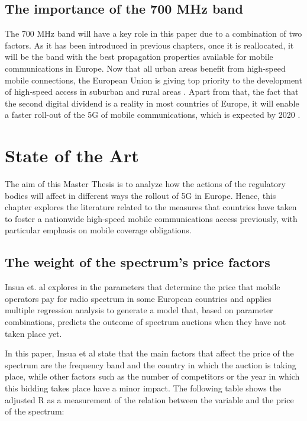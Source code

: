 \subsection*{The importance of the 700 MHz band}
The 700 MHz band will have a key role in this paper due to a combination of two factors. As it has been introduced in previous chapters, once it is reallocated, it will be the band with the best propagation properties available for mobile communications in Europe. Now that all urban areas benefit from high-speed mobile connections, the European Union is giving top priority to the development of high-speed access in suburban and rural areas \cite{1-28}. Apart from that, the fact that the second digital dividend is a reality in most countries of Europe, it will enable a faster roll-out of the 5G of mobile communications, which is expected by 2020 \cite{1-29}. \par

\section{State of the Art}
The aim of this Master Thesis is to analyze how the actions of the regulatory bodies will affect in different ways the rollout of 5G in Europe. Hence, this chapter explores the literature related to the measures that countries have taken to foster a nationwide high-speed mobile communications access previously, with particular emphasis on mobile coverage obligations. \par

\subsection*{The weight of the spectrum’s price factors}
Insua et. al explores in \cite{1-30} the parameters that determine the price that mobile operators pay for radio spectrum in some European countries and applies multiple regression analysis to generate a model that, based on parameter combinations, predicts the outcome of spectrum auctions when they have not taken place yet.\par

In this paper, Insua et al state that the main factors that affect the price of the spectrum are the frequency band and the country in which the auction is taking place, while other factors such as the number of competitors or the year in which this bidding takes place have a minor impact. The following table shows the adjusted R as a measurement of the relation between the variable and the price of the spectrum:


